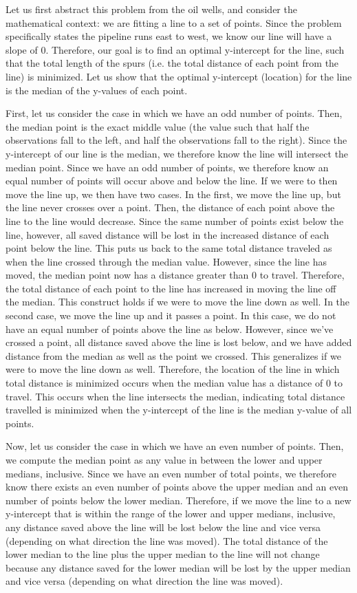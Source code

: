 \documentclass[11pt]{article}
\begin{document}
Let us first abstract this problem from the oil wells, and consider the mathematical context: we are fitting a line to a set of points. Since the problem specifically states the pipeline runs east to west, we know our line will have a slope of 0. Therefore, our goal is to find an optimal y-intercept for the line, such that the total length of the spurs (i.e. the total distance of each point from the line) is minimized. Let us show that the optimal y-intercept (location) for the line is the median of the y-values of each point.

First, let us consider the case in which we have an odd number of points. Then, the median point is the exact middle value (the value such that half the observations fall to the left, and half the observations fall to the right). Since the y-intercept of our line is the median, we therefore know the line will intersect the median point. Since we have an odd number of points, we therefore know an equal number of points will occur above and below the line. If we were to then move the line up, we then have two cases. In the first, we move the line up, but the line never crosses over a point. Then, the distance of each point above the line to the line would decrease. Since the same number of points exist below the line, however, all saved distance will be lost in the increased distance of each point below the line. This puts us back to the same total distance traveled as when the line crossed through the median value. However, since the line has moved, the median point now has a distance greater than 0 to travel. Therefore, the total distance of each point to the line has increased in moving the line off the median. This construct holds if we were to move the line down as well. In the second case, we move the line up and it passes a point. In this case, we do not have an equal number of points above the line as below. However, since we've crossed a point, all distance saved above the line is lost below, and we have added distance from the median as well as the point we crossed. This generalizes if we were to move the line down as well. Therefore, the location of the line in which total distance is minimized occurs when the median value has a distance of 0 to travel. This occurs when the line intersects the median, indicating total distance travelled is minimized when the y-intercept of the line is the median y-value of all points.

Now, let us consider the case in which we have an even number of points. Then, we compute the median point as any value in between the lower and upper medians, inclusive. Since we have an even number of total points, we therefore know there exists an even number of points above the upper median and an even number of points below the lower median. Therefore, if we move the line to a new y-intercept that is within the range of the lower and upper medians, inclusive, any distance saved above the line will be lost below the line and vice versa (depending on what direction the line was moved). The total distance of the lower median to the line plus the upper median to the line will not change because any distance saved for the lower median will be lost by the upper median and vice versa (depending on what direction the line was moved).
\end{document}
